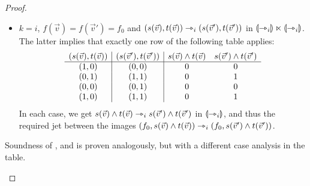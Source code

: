 \documentclass[a4paper]{article}
\begin{document}
\begin{proof}
\begin{itemize}
\begin{itemize}
			\item $k = i$, $f(\vec v) = f(\vec v') = f_0$ and $(s(\vec v), t(\vec v)) \rightarrowtriangle_i (s(\vec v'), t(\vec v'))$ in ${\llparenthesis \rightarrowtriangle_i \rrparenthesis} \ltimes {\llparenthesis \rightarrowtriangle_i \rrparenthesis}$.
			The latter implies that exactly one row of the following table applies:
			\[
				\begin{array}{c | c | c c}
					(s(\vec v), t(\vec v))
					& (s(\vec v'), t(\vec v'))
					& s(\vec v) \wedge t(\vec v)
					& s(\vec v') \wedge t(\vec v')
					\\ \hline
					(1, 0) & (0, 0) & 0 & 0
					\\
					(0, 1) & (1, 1) & 0 & 1
					\\
					(0, 0) & (0, 1) & 0 & 0
					\\
					(1, 0) & (1, 1) & 0 & 1
				\end{array}
			\]
			In each case, we get $s(\vec v) \wedge t(\vec v) \rightarrowtriangle_i s(\vec v') \wedge t(\vec v')$ in ${\llparenthesis \rightarrowtriangle_i \rrparenthesis}$, and thus the required jet between the images $(f_0, s(\vec v) \wedge t(\vec v)) \rightarrowtriangle_i (f_0, s(\vec v') \wedge t(\vec v'))$.
		\end{itemize}
		Soundness of ,  and  is proven analogously, but with a different case analysis in the table. \qedhere
		
%		
	\end{itemize}
\end{proof}
\end{document}
